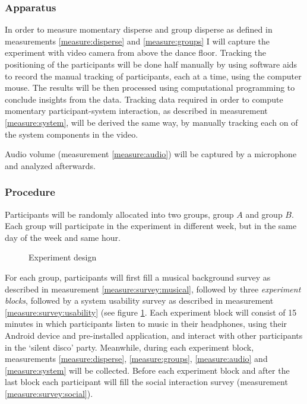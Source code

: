 \documentclass[a4paper,11pt]{article}
\newcommand{\definition}[1]{\emph{#1}}
\begin{document}
\subsubsection{Apparatus}

In order to measure momentary disperse and group disperse as defined in measurements \ref{measure:disperse} and \ref{measure:groups} I will capture the experiment with video camera from above the dance floor.
Tracking the positioning of the participants will be done half manually by using software aids to record the manual tracking of participants, each at a time, using the computer mouse.
The results will be then processed using computational programming to conclude insights from the data.
Tracking data required in order to compute momentary participant-system interaction, as described in measurement \ref{measure:system}, will be derived the same way, by manually tracking each on of the system components in the video.

Audio volume (measurement \ref{measure:audio}) will be captured by a microphone and analyzed afterwards.

\subsubsection{Procedure}

Participants will be randomly allocated into two groups, group $A$ and group $B$\@.
Each group will participate in the experiment in different week, but in the same day of the week and same hour.

\begin{figure}[!hb]
	\centering
	\def\svgwidth{0.8\textwidth}
  	
	\caption{Experiment design}\label{fig:experiment}
\end{figure}

For each group, participants will first fill a musical background survey as described in measurement \ref{measure:survey:musical}, followed by three \definition{experiment blocks}, followed by a system usability survey as described in measurement \ref{measure:survey:usability} (see figure \ref{fig:experiment}.
Each experiment block will consist of 15 minutes in which participants listen to music in their headphones, using their Android device and pre-installed application, and interact with other participants in the `silent disco' party.
Meanwhile, during each experiment block, measurements \ref{measure:disperse}, \ref{measure:groups}, \ref{measure:audio} and \ref{measure:system} will be collected.
Before each experiment block and after the last block each participant will fill the social interaction survey (measurement \ref{measure:survey:social}).
\end{document}
